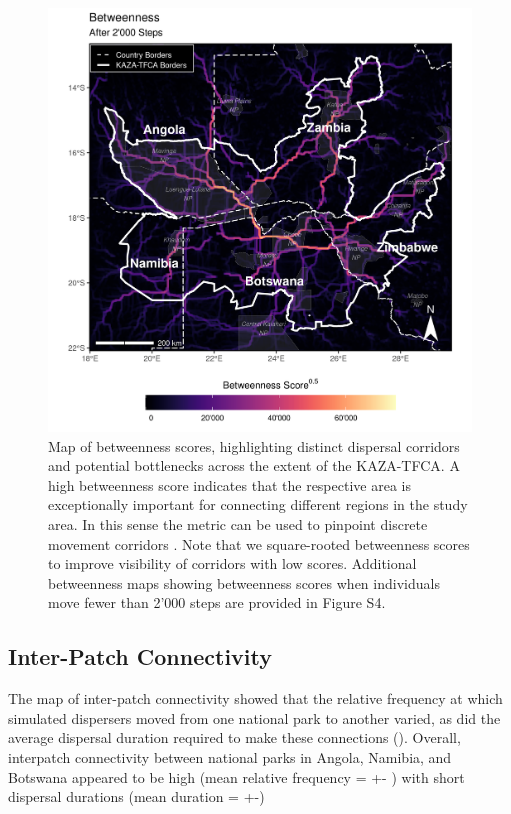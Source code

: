 \documentclass[abstract=on,10pt,a4paper,bibliography=totocnumbered]{article}
\begin{document}
\begin{figure}
  \includegraphics[width=\textwidth]{99_Betweenness.png}
  \caption{Map of betweenness scores, highlighting distinct dispersal corridors
  and potential bottlenecks across the extent of the KAZA-TFCA. A high
  betweenness score indicates that the respective area is exceptionally
  important for connecting different regions in the study area. In this sense
  the metric can be used to pinpoint discrete movement corridors
  \citep{BastilleRousseau.2018}. Note that we square-rooted betweenness scores
  to improve visibility of corridors with low scores. Additional betweenness
  maps showing betweenness scores when individuals move fewer than 2'000 steps
  are provided in Figure S4.}
  \label{Betweenness}
\end{figure}

\subsection{Inter-Patch Connectivity}
The map of inter-patch connectivity showed that the relative frequency at which
simulated dispersers moved from one national park to another varied, as did the
average dispersal duration required to make these connections
(). Overall, interpatch connectivity between
national parks in Angola, Namibia, and Botswana appeared to be high (mean
relative frequency = +- ) with short dispersal durations (mean duration = +-)
\end{document}
